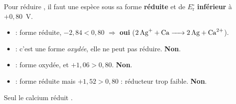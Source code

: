 \documentclass[11pt,a4paper]{article}
\begin{document}
\begin{corrige}
Pour réduire , il faut une espèce sous sa forme \textbf{réduite} et de
$E_{\mathrm{r}}^{\circ}$ \textbf{inférieur} à $+0{,}80$~V.
\begin{itemize}[leftmargin=1.5em,topsep=1pt,itemsep=1pt]
  \item {} : forme réduite, $-2{,}84<0{,}80$ $\Rightarrow$ \textbf{oui}
        ($\ce{2 Ag+ + Ca -> 2 Ag + Ca^{2+}}$).
  \item {} : c'est une forme \emph{oxydée}, elle ne peut pas réduire. \textbf{Non}.
  \item {} : forme oxydée, et $+1{,}06>0{,}80$. \textbf{Non}.
  \item {} : forme réduite mais $+1{,}52>0{,}80$ : réducteur trop faible. \textbf{Non}.
\end{itemize}
Seul le calcium  réduit .
\end{corrige}
\end{document}
